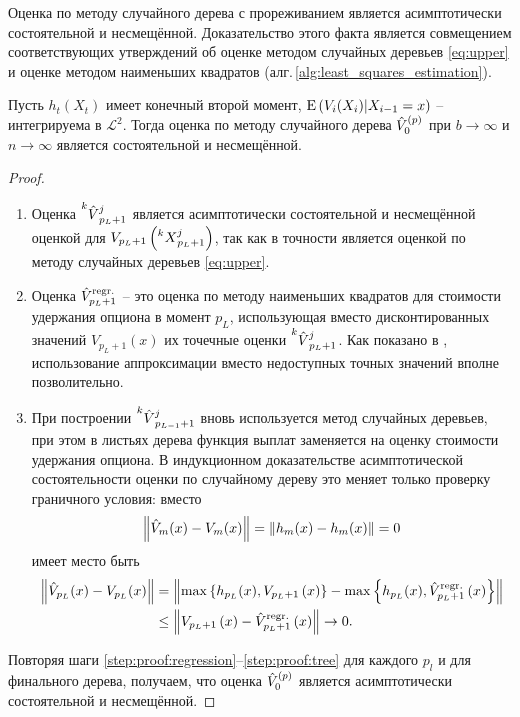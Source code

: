 Оценка по методу случайного дерева с прореживанием является асимптотически состоятельной и несмещённой. Доказательство этого факта является совмещением соответствующих утверждений об оценке методом случайных деревьев \eqref{eq:upper} и оценке методом наименьших квадратов (алг.\,\ref{alg:least_squares_estimation}).

\begin{theorem}
	Пусть $h_t(X_t)$ имеет конечный второй момент, $\mathrm{E}\left(V_i(X_i)\middle\vert X_{i-1} = x\right)$ -- интегрируема в $\mathcal L^2$. Тогда оценка по методу случайного дерева $\hat{V}_0^{(p)}$ при $b \to \infty$ и $n \to\infty$ является состоятельной и несмещённой.
\end{theorem}
\begin{proof}\hfill
	\begin{enumerate}
		\item Оценка $\prescript{k}{}{\hat{V}}_{p_L+1}^{j}$ является асимптотически состоятельной и несмещённой оценкой для $V_{p_L + 1}\left(\prescript{k}{}{X}_{p_L+1}^{j}\right)$, так как в точности является оценкой по методу случайных деревьев \eqref{eq:upper}.
		\item\label{step:proof:regression} Оценка $\hat{V}^{\mathrm{regr}.}_{p_L+1}$ -- это оценка по методу наименьших квадратов для стоимости удержания опциона в момент $p_L$, использующая вместо дисконтированных значений $V_{p_L+1}(x)$ их точечные оценки $\prescript{k}{}{\hat{V}}_{p_L+1}^{j}$. Как показано в \cite{Longstaff2001}, использование аппроксимации вместо недоступных точных значений вполне позволительно.
		\item\label{step:proof:tree} При построении $\prescript{k}{}{\hat{V}}_{p_{L-1}+1}^{j}$ вновь используется метод случайных деревьев, при этом в листьях дерева функция выплат заменяется на оценку стоимости удержания опциона. В индукционном доказательстве асимптотической состоятельности оценки по случайному дереву это меняет только проверку граничного условия: вместо 
		$$\left\lVert\hat{V}_m(x) - V_m(x)\right\rVert = \left\lVert h_m(x) - h_m(x)\right\rVert = 0$$ 
		имеет место быть 
		$$\begin{aligned}
		\left\lVert\hat{V}_{p_L}(x) - V_{p_L}(x)\right\rVert &= \left\lVert\max\left\lbrace h_{p_L}(x), V_{p_L + 1}\left(x\right)\right\rbrace - \max\left\lbrace h_{p_L}(x), \hat{V}^{\mathrm{regr}.}_{p_L+1}\left(x\right)\right\rbrace\right\rVert \\
		&\leq \left\lVert V_{p_L + 1}\left(x\right) - \hat{V}^{\mathrm{regr}.}_{p_L+1}\left(x\right)\right\rVert \to 0.
		\end{aligned}$$
	\end{enumerate}
	Повторяя шаги \ref{step:proof:regression}--\ref{step:proof:tree} для каждого $p_l$ и для финального дерева, получаем, что оценка $\hat{V}_0^{(p)}$ является асимптотически состоятельной и несмещённой.
\end{proof}


